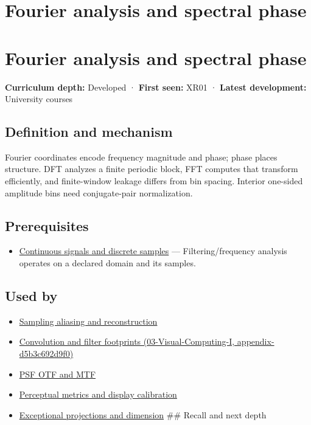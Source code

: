 \hypertarget{appendix-b60686ba06a1}{}
\section*{Fourier analysis and spectral phase}
\section{Fourier analysis and spectral phase}\label{appendix-b60686ba06a1-fourier-analysis-and-spectral-phase}

\textbf{Curriculum depth:} Developed · \textbf{First seen:} XR01 · \textbf{Latest development:} University courses

\subsection{Definition and mechanism}\label{appendix-b60686ba06a1-definition-and-mechanism}

Fourier coordinates encode frequency magnitude and phase; phase places structure. DFT analyzes a finite periodic block, FFT computes that transform efficiently, and finite-window leakage differs from bin spacing. Interior one-sided amplitude bins need conjugate-pair normalization.

\subsection{Prerequisites}\label{appendix-b60686ba06a1-prerequisites}

\begin{itemize}
\tightlist
\item
  \hyperref[appendix-1077ea8fc737]{Continuous signals and discrete samples} --- Filtering/frequency analysis operates on a declared domain and its samples.
\end{itemize}

\subsection{Used by}\label{appendix-b60686ba06a1-used-by}

\begin{itemize}
\item
  \hyperref[appendix-6a7869dd79a6]{Sampling aliasing and reconstruction}
\item
  \href{../03-Visual-Computing-I/main.pdf\#nameddest=appendix-d5b3c692d9f0}{Convolution and filter footprints (03-Visual-Computing-I, appendix-d5b3c692d9f0)}
\item
  \hyperref[appendix-8b76b0efd27f]{PSF OTF and MTF}
\item
  \hyperref[appendix-b2c1846508bf]{Perceptual metrics and display calibration}
\item
  \hyperref[appendix-3c73f7862157]{Exceptional projections and dimension} \#\# Recall and next depth
\end{itemize}

